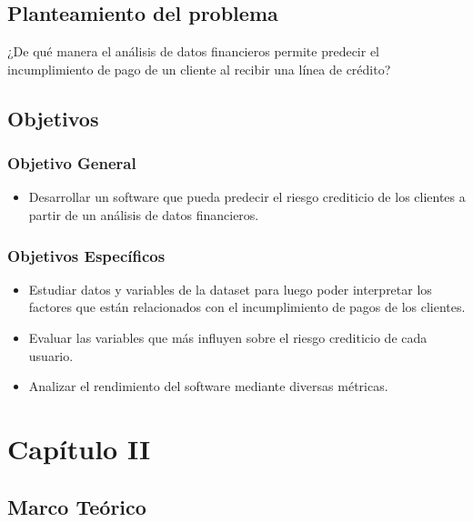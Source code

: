 \documentclass[12pt,a4paper]{article}
\begin{document}
\subsection{Planteamiento del problema}

¿De qué manera el análisis de datos financieros permite predecir el incumplimiento de pago de un cliente al recibir una línea de crédito?

\subsection{Objetivos}
\subsubsection{Objetivo General}

\begin{itemize}[label=-]
    \item Desarrollar un software que pueda predecir el riesgo crediticio de los clientes a partir de un análisis de datos financieros.
\end{itemize}

\subsubsection{Objetivos Específicos}

\begin{itemize}[label=-]
    \item Estudiar datos y variables de la dataset para luego poder interpretar los factores que están relacionados con el incumplimiento de pagos de los clientes.
    \item Evaluar las variables que más influyen sobre el riesgo crediticio de cada usuario.
    \item Analizar el rendimiento del software mediante diversas métricas.
\end{itemize}

\section*{\centering Capítulo II}

\setcounter{section}{2}
\setcounter{subsection}{0}
\subsection{Marco Teórico}
\end{document}
